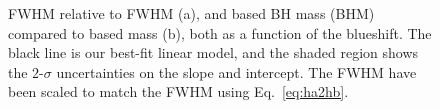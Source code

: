 \begin{figure}
    \captionsetup[subfigure]{labelformat=empty} 
    \centering
    \subfloat[\label{fig:correction_ha_a}]{}
    \subfloat[\label{fig:correction_ha_b}]{}
    \caption[{ FWHM relative to \ha FWHM (a), and  based BH mass (BHM) compared to \ha based mass (b), both as a function of the  blueshift.}]{ FWHM relative to \ha FWHM (a), and  based BH mass (BHM) compared to \ha based mass (b), both as a function of the  blueshift. The black line is our best-fit linear model, and the shaded region shows the $2$-$\sigma$ uncertainties on the slope and intercept. The \ha FWHM have been scaled to match the \hb FWHM using Eq.~\ref{eq:ha2hb}.}  
    \label{fig:correction_ha}
\end{figure}

